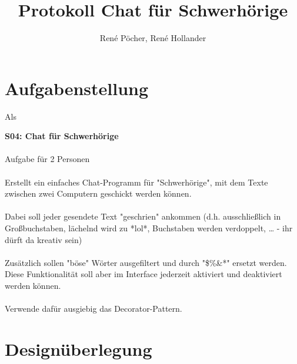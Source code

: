 \documentclass[a4paper, 11pt]{article}
\title{Protokoll Chat für Schwerhörige}
\author{René Pöcher, René Hollander}
\begin{document}
\maketitle

\newpage  \tableofcontents \newpage

\section{Aufgabenstellung}



Als 

\textbf{S04: Chat für Schwerhörige}
\\\\
Aufgabe für 2 Personen
\\\\
Erstellt ein einfaches Chat-Programm für "Schwerhörige", mit dem Texte zwischen zwei Computern geschickt werden können.
\\\\
Dabei soll jeder gesendete Text "geschrien" ankommen (d.h. ausschließlich in Großbuchstaben, lächelnd wird zu *lol*, Buchstaben werden verdoppelt, … - ihr dürft da kreativ sein)
\\\\
Zusätzlich sollen "böse" Wörter ausgefiltert und durch "\$\%\&*" ersetzt werden. Diese Funktionalität soll aber im Interface jederzeit aktiviert und deaktiviert werden können.
\\\\
Verwende dafür ausgiebig das Decorator-Pattern.

 \newpage


\section{Designüberlegung}
\end{document}
